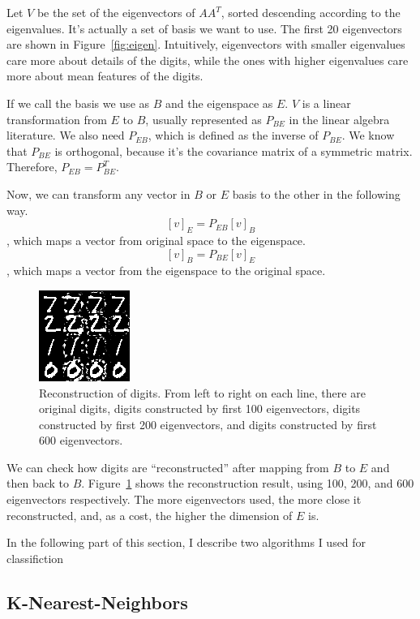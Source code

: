 \documentclass[10pt]{article}
\begin{document}
Let $V$ be the set of the eigenvectors of $AA^T$, sorted descending
according to the eigenvalues. It's actually a set of basis we want to
use. The first 20 eigenvectors are shown in Figure~\ref{fig:eigen}.
Intuitively, eigenvectors with smaller eigenvalues care more about
details of the digits, while the ones with higher eigenvalues care
more about mean features of the digits.

If we call the basis we use as $B$ and the eigenspace as $E$. $V$
is a linear transformation from $E$ to $B$, usually represented as
$P_{BE}$ in the linear algebra literature. We also need $P_{EB}$,
which is defined as the inverse of $P_{BE}$. We know that $P_{BE}$ is
orthogonal, because it's the covariance matrix of a symmetric matrix.
Therefore, $P_{EB} = P_{BE}^T$.

Now, we can transform any vector in $B$ or $E$ basis to the other in
the following way.
$$[v]_E = P_{EB} [v]_B$$, which maps a vector from original space to
the eigenspace.
$$[v]_B = P_{BE} [v]_E$$, which maps a vector from the eigenspace to
the original space.

\begin{figure}
\centering
\includegraphics[]{test.png}
\caption{Reconstruction of digits. From left to right on each line,
there are original digits, digits constructed by first 100
eigenvectors, digits constructed by first 200 eigenvectors, and digits
constructed by first 600 eigenvectors. }
\label{fig:test}
\end{figure}

We can check how digits are ``reconstructed'' after mapping from $B$ to
$E$ and then back to $B$. Figure~\ref{fig:test} shows the
reconstruction result, using 100, 200, and 600 eigenvectors
respectively. The more eigenvectors used, the more close it
reconstructed, and, as a cost, the higher the dimension of $E$ is.

In the following part of this section, I describe two algorithms I
used for classifiction

\subsection{K-Nearest-Neighbors}
\end{document}
